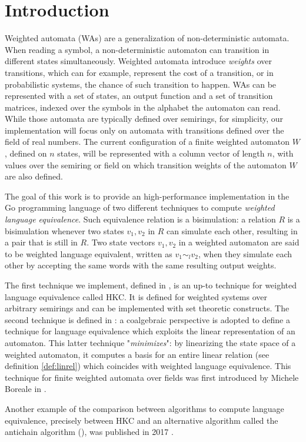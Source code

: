 \section{Introduction}
\label{sec:intro}

Weighted automata (WAs) are a generalization of non-deterministic automata.
When reading a symbol, a non-deterministic automaton 
can transition in different states simultaneously. Weighted automata
introduce \textit{weights} over transitions, which can for example, 
represent the cost of a transition, 
or in probabilistic systems, the chance of such transition to happen.
WAs can be represented with a set of states, an output function and
a set of transition matrices, indexed over the symbols in the alphabet
the automaton can read. While those automata are typically defined over semirings,
for simplicity, our implementation will focus only on automata with 
transitions defined over the field of real numbers. 
The current configuration of a finite weighted automaton $W$,
defined on $n$ states, will be represented with a column vector of length
$n$, with values over the semiring or field on which transition weights of the
automaton $W$ are also defined. 

The goal of this work is to provide an high-performance implementation 
in the Go programming language of two different techniques 
to compute \textit{weighted language equivalence}.
Such equivalence relation is a bisimulation:
a relation $R$ is a bisimulation whenever two states $v_1, v_2$ in $R$ 
can simulate each other, resulting in a pair that is still in $R$.
Two state vectors $v_1, v_2$ in a weighted automaton are said to be 
weighted language equivalent, written as $v_1 \sim_l v_2$, when 
they simulate each other by accepting the same words with the same resulting output weights. 

The first technique we implement, 
defined in \cite{DBLP:journals/corr/Bonchi0K17}, is an up-to technique
for weighted language equivalence called HKC. It is defined for
weighted systems over arbitrary semirings and can be implemented with 
set theoretic constructs. The second technique is defined in \cite{BONCHI201277}:
a coalgebraic perspective is adopted to define a technique for language equivalence 
which exploits the linear representation of an automaton. 
This latter technique "\textit{minimizes}": by linearizing the state space of a
weighted automaton, 
it computes a basis for an entire linear relation (see definition \ref{def:linrel})
which coincides
with weighted language equivalence.
This technique for finite weighted automata over fields was first 
introduced by Michele Boreale in \cite{boreale2009weighted}.

Another example of the comparison between algorithms to compute 
language equivalence, precisely between HKC and an alternative
algorithm called the antichain algorithm (\cite{de2006antichains}),
was published in 2017 \cite{fu2017equivalence}.
